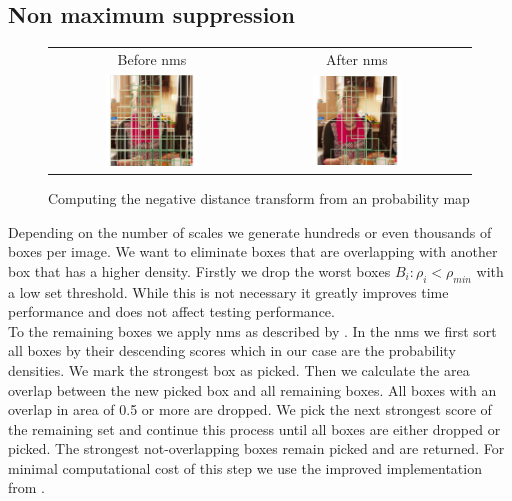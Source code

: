 \subsection{Non maximum suppression}
\label{sec:pipeline:eval:nms}
\begin{figure}[htb]
    \begin{tabular}{ccc}
        Before \gls{nms} & After \gls{nms} \\[3pt]
        \includegraphics[width=0.47\textwidth]{figures/nms_before} &
        \includegraphics[width=0.47\textwidth]{figures/nms_after}
    \end{tabular}
	\caption{Computing the negative distance transform from an probability map}
    \label{fig:nms}
\end{figure}
Depending on the number of scales we generate hundreds or even thousands of boxes per image. We want to eliminate boxes that are overlapping with another box that has a higher density. Firstly we drop the worst boxes $B_i: \rho_i < \rho_{min}$ with a low set threshold. While this is not necessary it greatly improves time performance and does not affect testing performance.\\To the remaining boxes we apply \gls{nms} as described by \citet{felzenszwalb_discriminatively_2008}. In the \gls{nms} we first sort all boxes by their descending scores which in our case are the probability densities. We mark the strongest box as picked. Then we calculate the area overlap between the new picked box and all remaining boxes. All boxes with an overlap in area of 0.5 or more are dropped. We pick the next strongest score of the remaining set and continue this process until all boxes are either dropped or picked. The strongest not-overlapping boxes remain picked and are returned. For minimal computational cost of this step we use the improved implementation from \citet{malisiewicz_ensemble_2011}.

